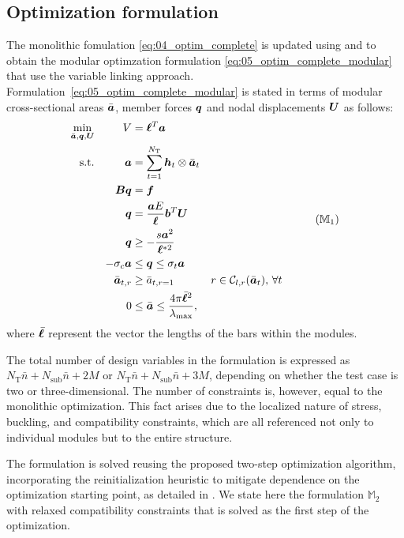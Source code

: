\subsection{Optimization formulation}
The monolithic fomulation \ref{eq:04_optim_complete} is updated using  and  to obtain the modular optimzation formulation \ref{eq:05_optim_complete_modular} that use the variable linking approach. Formulation~\ref{eq:05_optim_complete_modular} is stated in terms of modular cross-sectional areas $\bar{\bm{a}}$, member forces $\bm{q}$ and nodal displacements $\bm{U}$ as follows:
\begin{equation}
    \begin{aligned}
    \min_{\bar{\vect{a}}, \vect{q}, \vect{U}}   && V &= \vect{\ell}^{T}\vect{a}\\
    \textrm{s.t.}  && \vect{a} &= \sum_{t=1}^{N_\text{T}} \vect{h}_t\otimes\bar{\vect{a}}_t \\ 
    && \matr{B}\vect{q} &= \vect{f} && \\
    && \vect{q} &= \frac{\vect{a}E}{\vect{\ell}}\vect{b}^T\vect{U} &&  \\
    && \vect{q} &\geq -\frac{s\vect{a}^2}{\vect{\ell}^{*2}} &&  \\
    && -\sigma_c\vect{a} &\leq \vect{q} \leq \sigma_t\vect{a} &&  \\
    && \bar{\vect{a}}_{t,r}&\geq \bar{a}_{t,r=1} && r \in \mathcal{C}_{l,r}(\bar{\vect{a}}_t),\, \forall t \\
    && 0 &\leq \bar{\vect{a}} \leq \frac{4 \pi \bar{\vect{\ell}}^2}{\lambda_{\text{max}}}, \\
    \end{aligned}
    \tag{${\mathbb{M}}_\text{1}$}
    \label{eq:05_optim_complete_modular}
\end{equation}
where $\bar{\bm{\ell}}$ represent the vector the lengths of the bars within the modules.

The total number of design variables in the formulation is expressed as $N_\text{T}\bar{n} + N_{\text{sub}}\bar{n} + 2M$ or $N_\text{T}\bar{n} + N_{\text{sub}}\bar{n} + 3M$, depending on whether the test case is two or three-dimensional. The number of constraints is, however, equal to the monolithic optimization. This fact arises due to the localized nature of stress, buckling, and compatibility constraints, which are all referenced not only to individual modules but to the entire structure.

The formulation is solved reusing the proposed two-step optimization algorithm, incorporating the reinitialization heuristic to mitigate dependence on the optimization starting point, as detailed in . We state here the formulation $\mathbb{M}_\text{2}$ with relaxed compatibility constraints that is solved as the first step of the optimization. 

